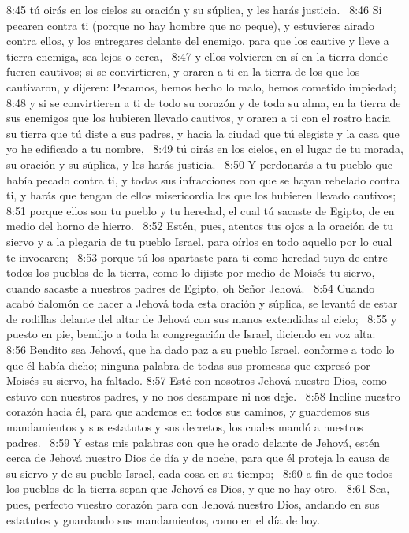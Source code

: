 8:45 tú oirás en los cielos su oración y su súplica, y les harás justicia.  
8:46 Si pecaren contra ti (porque no hay hombre que no peque), y estuvieres airado contra ellos, y los entregares delante del enemigo, para que los cautive y lleve a tierra enemiga, sea lejos o cerca,  
8:47 y ellos volvieren en sí en la tierra donde fueren cautivos; si se convirtieren, y oraren a ti en la tierra de los que los cautivaron, y dijeren: Pecamos, hemos hecho lo malo, hemos cometido impiedad;  
8:48 y si se convirtieren a ti de todo su corazón y de toda su alma, en la tierra de sus enemigos que los hubieren llevado cautivos, y oraren a ti con el rostro hacia su tierra que tú diste a sus padres, y hacia la ciudad que tú elegiste y la casa que yo he edificado a tu nombre,  
8:49 tú oirás en los cielos, en el lugar de tu morada, su oración y su súplica, y les harás justicia.  
8:50 Y perdonarás a tu pueblo que había pecado contra ti, y todas sus infracciones con que se hayan rebelado contra ti, y harás que tengan de ellos misericordia los que los hubieren llevado cautivos;  
8:51 porque ellos son tu pueblo y tu heredad, el cual tú sacaste de Egipto, de en medio del horno de hierro.  
8:52 Estén, pues, atentos tus ojos a la oración de tu siervo y a la plegaria de tu pueblo Israel, para oírlos en todo aquello por lo cual te invocaren;  
8:53 porque tú los apartaste para ti como heredad tuya de entre todos los pueblos de la tierra, como lo dijiste por medio de Moisés tu siervo, cuando sacaste a nuestros padres de Egipto, oh Señor Jehová.  
8:54 Cuando acabó Salomón de hacer a Jehová toda esta oración y súplica, se levantó de estar de rodillas delante del altar de Jehová con sus manos extendidas al cielo;  
8:55 y puesto en pie, bendijo a toda la congregación de Israel, diciendo en voz alta:  
8:56 Bendito sea Jehová, que ha dado paz a su pueblo Israel, conforme a todo lo que él había dicho; ninguna palabra de todas sus promesas que expresó por Moisés su siervo, ha faltado. 
8:57 Esté con nosotros Jehová nuestro Dios, como estuvo con nuestros padres, y no nos desampare ni nos deje.  
8:58 Incline nuestro corazón hacia él, para que andemos en todos sus caminos, y guardemos sus mandamientos y sus estatutos y sus decretos, los cuales mandó a nuestros padres.  
8:59 Y estas mis palabras con que he orado delante de Jehová, estén cerca de Jehová nuestro Dios de día y de noche, para que él proteja la causa de su siervo y de su pueblo Israel, cada cosa en su tiempo;  
8:60 a fin de que todos los pueblos de la tierra sepan que Jehová es Dios, y que no hay otro.  
8:61 Sea, pues, perfecto vuestro corazón para con Jehová nuestro Dios, andando en sus estatutos y guardando sus mandamientos, como en el día de hoy.  

